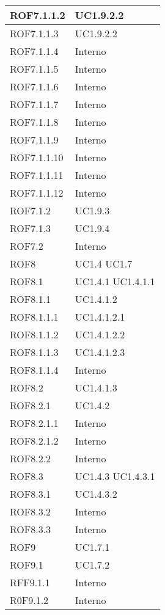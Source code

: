 \begin{center}
\begin{longtable}{| p{4cm} | p{4cm} |}
\hline
ROF7.1.1.2   &  UC1.9.2.2 \\
\hline
ROF7.1.1.3   &  UC1.9.2.2 \\
\hline
ROF7.1.1.4   &  Interno \\
\hline
ROF7.1.1.5   &  Interno \\
\hline
ROF7.1.1.6   &  Interno \\
\hline
ROF7.1.1.7   &  Interno \\
\hline
ROF7.1.1.8   &  Interno \\
\hline
ROF7.1.1.9   &  Interno \\
\hline
ROF7.1.1.10   &  Interno \\
\hline
ROF7.1.1.11   &  Interno \\
\hline
ROF7.1.1.12   &  Interno \\
\hline
ROF7.1.2   &  UC1.9.3  \\
\hline
ROF7.1.3   &  UC1.9.4  \\
\hline
ROF7.2   &  Interno \\
\hline
ROF8   &  UC1.4 \newline UC1.7 \\
\hline
ROF8.1   &  UC1.4.1 \newline UC1.4.1.1 \\
\hline
ROF8.1.1   &  UC1.4.1.2 \\
\hline
ROF8.1.1.1   &  UC1.4.1.2.1 \\
\hline
ROF8.1.1.2   &  UC1.4.1.2.2 \\
\hline
ROF8.1.1.3   &  UC1.4.1.2.3 \\
\hline
ROF8.1.1.4   &  Interno \\
\hline
ROF8.2   &  UC1.4.1.3 \\
\hline
ROF8.2.1   &  UC1.4.2 \\
\hline
ROF8.2.1.1   &  Interno \\
\hline
ROF8.2.1.2   &  Interno \\
\hline
ROF8.2.2   &  Interno \\
\hline
ROF8.3   &  UC1.4.3 \newline UC1.4.3.1  \\
\hline
ROF8.3.1   &  UC1.4.3.2 \\
\hline
ROF8.3.2   &  Interno \\
\hline
ROF8.3.3   &  Interno \\
\hline
ROF9   &  UC1.7.1 \\
\hline
ROF9.1   &  UC1.7.2 \\
\hline
RFF9.1.1   &  Interno \\
\hline
R0F9.1.2   &  Interno \\

\end{longtable}
\end{center}
